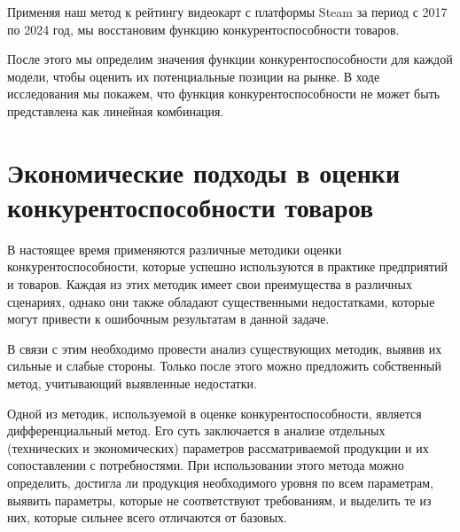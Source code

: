 \documentclass[14pt, a4paper]{extarticle}
\begin{document}
  Применяя наш метод к рейтингу видеокарт с платформы Steam за период с 2017 по 2024 год, мы восстановим функцию конкурентоспособности товаров.
  
  После этого мы определим значения функции конкурентоспособности для каждой модели, чтобы оценить их потенциальные позиции на рынке. В ходе исследования мы покажем, что функция конкурентоспособности не может быть представлена как линейная комбинация.

  \newpage


  \section{Экономические подходы в оценки конкурентоспособности товаров}
  В настоящее время применяются различные методики оценки
  конкурентоспособности, которые успешно используются в практике
  предприятий и товаров. Каждая из этих методик имеет свои преимущества в
  различных сценариях, однако они также обладают существенными
  недостатками, которые могут привести к ошибочным результатам в данной
  задаче.
  
  В связи с этим необходимо провести анализ существующих методик, выявив
  их сильные и слабые стороны. Только после этого можно предложить
  собственный метод, учитывающий выявленные недостатки.
  
  Одной из методик, используемой в оценке конкурентоспособности, является
  дифференциальный метод. Его суть заключается в анализе отдельных
  (технических и экономических) параметров рассматриваемой продукции и их
  сопоставлении с потребностями. При использовании этого метода можно
  определить, достигла ли продукция необходимого уровня по всем
  параметрам, выявить параметры, которые не соответствуют требованиям, и
  выделить те из них, которые сильнее всего отличаются от базовых.
\end{document}
